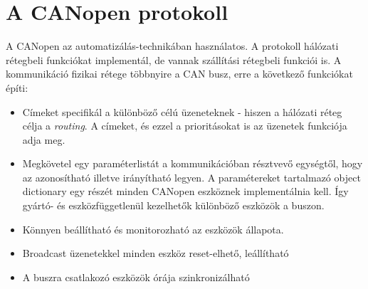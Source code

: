 %
%
%
%	

\pagebreak
\section{A CANopen protokoll}




	A CANopen az automatizálás-technikában használatos. A protokoll hálózati rétegbeli funkciókat implementál, de vannak szállítási rétegbeli funkciói is. A kommunikáció fizikai rétege többnyire a CAN busz, erre a következő funkciókat építi:
	
	\begin{itemize}
		\item Címeket specifikál a különböző célú üzeneteknek - hiszen a hálózati réteg célja a \textit{routing}. A címeket, és ezzel a prioritásokat is az üzenetek funkciója adja meg.
        \item Megkövetel egy paraméterlistát a kommunikációban résztvevő egységtől, hogy az azonosítható illetve irányítható legyen. A paramétereket tartalmazó object dictionary egy részét minden CANopen eszköznek implementálnia kell. Így gyártó- és eszközfüggetlenül kezelhetők különböző eszközök a buszon.

		\item Könnyen beállítható és monitorozható az eszközök állapota.
		\item Broadcast üzenetekkel minden eszköz reset-elhető, leállítható 
		\item A buszra csatlakozó eszközök órája szinkronizálható
	\end{itemize}
	
